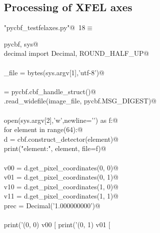 \documentclass[10pt,a4paper,twoside,notitlepage]{article}
\begin{document}
\subsection{Processing of XFEL axes}

\begin{flushleft} \small
\begin{minipage}{\linewidth}\label{scrap17}\raggedright\small
{} \verb@"pycbf_testfelaxes.py"@\nobreak\ {\footnotesize {18}}$\equiv$
\vspace{-1ex}
\begin{list}{}{} \item
\mbox{}\verb@import pycbf, sys@\\
\mbox{}\verb@from decimal import Decimal, ROUND_HALF_UP@\\
\mbox{}\verb@@\\
\mbox{}\verb@image_file = bytes(sys.argv[1],'utf-8')@\\
\mbox{}\verb@@\\
\mbox{}\verb@cbf = pycbf.cbf_handle_struct()@\\
\mbox{}\verb@cbf.read_widefile(image_file, pycbf.MSG_DIGEST)@\\
\mbox{}\verb@@\\
\mbox{}\verb@with open(sys.argv[2],'w',newline='\n') as f:@\\
\mbox{}\verb@    for element in range(64):@\\
\mbox{}\verb@        d = cbf.construct_detector(element)@\\
\mbox{}\verb@        print("element:", element, file=f)@\\
\mbox{}\verb@@\\
\mbox{}\verb@        v00 = d.get_pixel_coordinates(0, 0)@\\
\mbox{}\verb@        v01 = d.get_pixel_coordinates(0, 1)@\\
\mbox{}\verb@        v10 = d.get_pixel_coordinates(1, 0)@\\
\mbox{}\verb@        v11 = d.get_pixel_coordinates(1, 1)@\\
\mbox{}\verb@        prec = Decimal('1.000000000')@\\
\mbox{}\verb@@\\
\mbox{}\verb@        print('(0, 0) v00 [ %.9f %.9f %.9f ]' %(round(v00[0],9), round(v00[1],9), round(v00[2],9)), file=f)@\\
\mbox{}\verb@        print('(0, 1) v01 [ %.9g %.9g %.9g ]' %(round(v01[0],9), round(v01[1],9), round(v01[2],9)), file=f)@\\

\end{list}
\end{minipage}
\end{flushleft}
\end{document}
